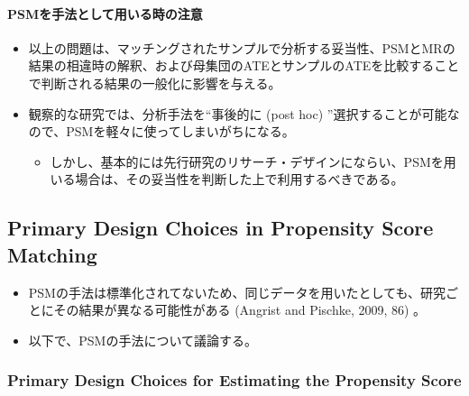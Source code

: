 \paragraph{PSMを手法として用いる時の注意}

\begin{itemize}
 \item 以上の問題は、マッチングされたサンプルで分析する妥当性、PSMとMRの結果の相違時の解釈、および母集団のATEとサンプルのATEを比較することで判断される結果の一般化に影響を与える。
 \item 観察的な研究では、分析手法を``事後的に (post hoc) ''選択することが可能なので、PSMを軽々に使ってしまいがちになる。
       \begin{itemize}
        \item しかし、基本的には先行研究のリサーチ・デザインにならい、PSMを用いる場合は、その妥当性を判断した上で利用するべきである。
       \end{itemize}
\end{itemize}

\subsection*{Primary Design Choices in Propensity Score Matching}

\begin{itemize}
 \item PSMの手法は標準化されてないため、同じデータを用いたとしても、研究ごとにその結果が異なる可能性がある (Angrist and Pischke, 2009, 86) 。
 \item 以下で、PSMの手法について議論する。
\end{itemize}

\subsubsection*{Primary Design Choices for Estimating the Propensity Score}

